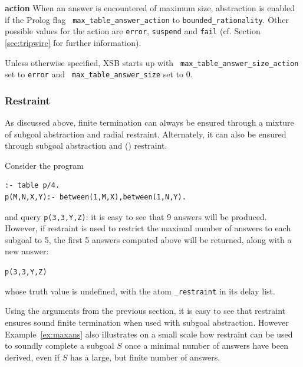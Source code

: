 \item {\bf action} When an answer is encountered of maximum size,
  abstraction is enabled if the Prolog flag {\tt
    max\_table\_answer\_action} to {\tt bounded\_rationality}.  Other
  possible values for the action are {\tt error}, {\tt suspend}  and {\tt fail}
  (cf. Section \ref{sec:tripwire} for further information).  \ei


%
Unless otherwise specified, XSB starts up with {\tt
  max\_table\_answer\_size\_action} set to {\tt error} and {\tt
  max\_table\_answer\_size} set to 0.  
%

\subsubsection{\MAXANS Restraint} \label{sec:answer-count-restraint}

As discussed above, finite termination can always be ensured through a
mixture of subgoal abstraction and radial restraint.  Alternately, it
can also be ensured through subgoal abstraction and \maxans()
restraint.  

\begin{example} \label{ex:maxans}
Consider the program

\begin{verbatim}
:- table p/4.
p(M,N,X,Y):- between(1,M,X),between(1,N,Y).
\end{verbatim}

\noindent
and query {\tt p(3,3,Y,Z)}: it is easy to see that 9 answers will be
produced.  However, if \maxans{} restraint is used to restrict the
maximal number of answers to each subgoal to 5, the first 5 answers
computed above will be returned, along with a new answer:

{\tt p(3,3,Y,Z)}

\noindent
whose truth value is undefined, with the atom 
%
{\tt \maxUans\_restraint} in its delay list.
\end{example}

Using the arguments from the previous section, it is easy to see that
\maxans{} restraint ensures sound finite termination when used with
subgoal abstraction.  However Example~\ref{ex:maxans} also illustrates
on a small scale how \maxans{} restraint can be used to soundly
complete a subgoal $S$ once a minimal number of answers have been
derived, even if $S$ has a large, but finite number of answers.

